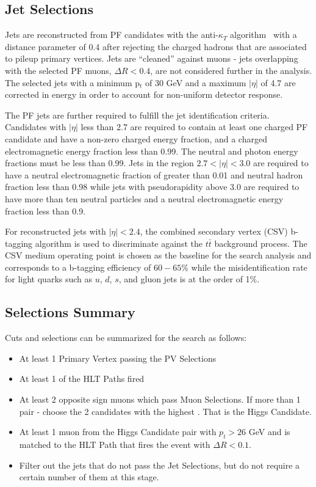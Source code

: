 \subsection{Jet Selections}
Jets are reconstructed from PF candidates with the anti-$\kappa_{T}$ algorithm~\cite{Cacciari:2008gp} with a distance parameter of 0.4 after rejecting the charged hadrons that are associated to pileup primary vertices. Jets are ``cleaned'' against muons - jets overlapping with the selected PF muons, $\Delta R < 0.4$, are not considered further in the analysis. The selected jets with a minimum p$_t$ of 30 GeV and a maximum $|\eta|$ of 4.7 are corrected in energy in order to account for non-uniform detector response.

The PF jets are further required to fulfill the jet identification criteria.
Candidates with $|\eta|$ less than 2.7 are required to contain at
least one charged PF candidate and have a non-zero charged energy fraction,
and a charged electromagnetic energy fraction less than 0.99. The
neutral and photon energy fractions must be less than 0.99. Jets in
the region $2.7<|\eta|<3.0$ are required to have a neutral electromagnetic
fraction of greater than 0.01 and neutral hadron fraction less than
0.98 while jets with pseudorapidity above 3.0 are required to have more
than ten neutral particles and a neutral electromagnetic energy fraction
less than 0.9.

For reconstructed jets with $|\eta| < 2.4$, the combined secondary vertex (CSV) b-tagging algorithm \cite{Chatrchyan:2012jua} is used to discriminate against the $t\bar{t}$ background process. The CSV medium operating point is chosen as the baseline for the search analysis and corresponds to a b-tagging efficiency of $60-65\%$ while the misidentification rate for light quarks such as $u$, $d$, $s$, and gluon jets is at the order of 1\%.

\subsection{Selections Summary}
Cuts and selections can be summarized for the search as follows:
\begin{itemize}
  \item At least 1 Primary Vertex passing the PV Selections
  \item At least 1 of the HLT Paths fired
  \item At least 2 opposite sign muons which pass Muon Selections. If more than 1 pair - choose the 2 candidates with the highest \pt. That is the Higgs Candidate.
  \item At least 1 muon from the Higgs Candidate pair with $p_t > 26$ GeV and is matched to the HLT Path that fires the event with $\Delta R < 0.1$.
  \item Filter out the jets that do not pass the Jet Selections, but do not require a certain number of them at this stage.
\end{itemize}

